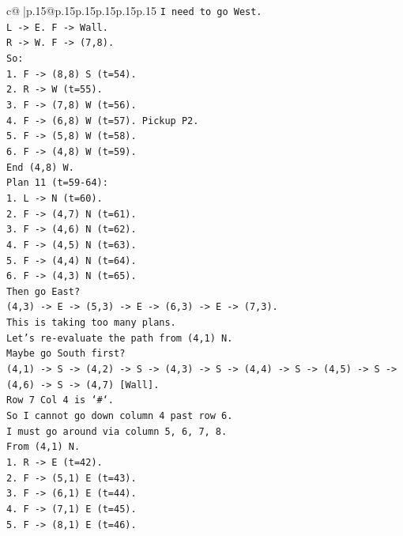 \documentclass{article}
\begin{document}
{\begin{supertabular}{c@{$\;$}|p{.15\linewidth}@{}p{.15\linewidth}p{.15\linewidth}p{.15\linewidth}p{.15\linewidth}p{.15\linewidth}}
{{{\texttt{I need to go West.} \\
\texttt{L {-}> E. F {-}> Wall.} \\
\texttt{R {-}> W. F {-}> (7,8).} \\
\texttt{So:} \\
\texttt{1. F {-}> (8,8) S (t=54).} \\
\texttt{2. R {-}> W (t=55).} \\
\texttt{3. F {-}> (7,8) W (t=56).} \\
\texttt{4. F {-}> (6,8) W (t=57). Pickup P2.} \\
\texttt{5. F {-}> (5,8) W (t=58).} \\
\texttt{6. F {-}> (4,8) W (t=59).} \\
\texttt{End (4,8) W.} \\
\texttt{Plan 11 (t=59{-}64):} \\
\texttt{1. L {-}> N (t=60).} \\
\texttt{2. F {-}> (4,7) N (t=61).} \\
\texttt{3. F {-}> (4,6) N (t=62).} \\
\texttt{4. F {-}> (4,5) N (t=63).} \\
\texttt{5. F {-}> (4,4) N (t=64).} \\
\texttt{6. F {-}> (4,3) N (t=65).} \\
\texttt{Then go East?} \\
\texttt{(4,3) {-}> E {-}> (5,3) {-}> E {-}> (6,3) {-}> E {-}> (7,3).} \\
\texttt{This is taking too many plans.} \\
\texttt{Let's re{-}evaluate the path from (4,1) N.} \\
\texttt{Maybe go South first?} \\
\texttt{(4,1) {-}> S {-}> (4,2) {-}> S {-}> (4,3) {-}> S {-}> (4,4) {-}> S {-}> (4,5) {-}> S {-}> (4,6) {-}> S {-}> (4,7) {[}Wall{]}.} \\
\texttt{Row 7 Col 4 is `\#`.} \\
\texttt{So I cannot go down column 4 past row 6.} \\
\texttt{I must go around via column 5, 6, 7, 8.} \\
\texttt{From (4,1) N.} \\
\texttt{1. R {-}> E (t=42).} \\
\texttt{2. F {-}> (5,1) E (t=43).} \\
\texttt{3. F {-}> (6,1) E (t=44).} \\
\texttt{4. F {-}> (7,1) E (t=45).} \\
\texttt{5. F {-}> (8,1) E (t=46).} \\
}}}
\end{supertabular}}
\end{document}
